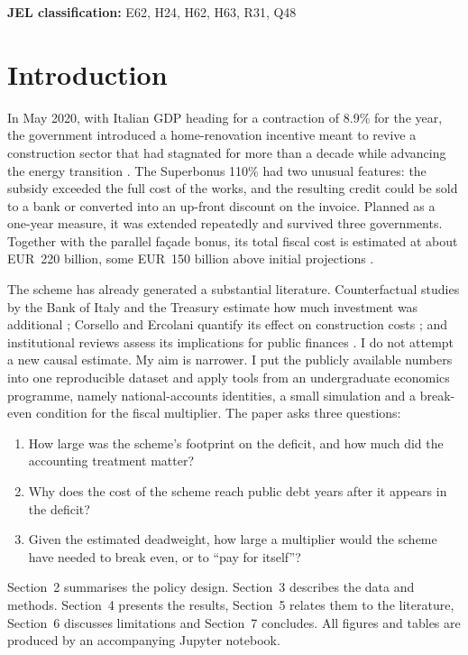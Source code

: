 \documentclass[11pt,a4paper]{article}
\begin{document}
\textbf{JEL classification:} E62, H24, H62, H63, R31, Q48

\section{Introduction}
In May 2020, with Italian GDP heading for a contraction of 8.9\% for the year, the government introduced a home-renovation incentive meant to revive a construction sector that had stagnated for more than a decade while advancing the energy transition \citep{capone2026}. The Superbonus 110\% had two unusual features: the subsidy exceeded the full cost of the works, and the resulting credit could be sold to a bank or converted into an up-front discount on the invoice. Planned as a one-year measure, it was extended repeatedly and survived three governments. Together with the parallel façade bonus, its total fiscal cost is estimated at about EUR~220 billion, some EUR~150 billion above initial projections \citep{capone2026}.

The scheme has already generated a substantial literature. Counterfactual studies by the Bank of Italy and the Treasury estimate how much investment was additional \citep{accetturo2026,mef_wp}; Corsello and Ercolani quantify its effect on construction costs \citep{corsello2024,corsello2025}; and institutional reviews assess its implications for public finances \citep{codogno2024,imf2024}. I do not attempt a new causal estimate. My aim is narrower. I put the publicly available numbers into one reproducible dataset and apply tools from an undergraduate economics programme, namely national-accounts identities, a small simulation and a break-even condition for the fiscal multiplier. The paper asks three questions:

\begin{enumerate}[leftmargin=1.5em,itemsep=2pt]
\item How large was the scheme's footprint on the deficit, and how much did the accounting treatment matter?
\item Why does the cost of the scheme reach public debt years after it appears in the deficit?
\item Given the estimated deadweight, how large a multiplier would the scheme have needed to break even, or to ``pay for itself''?
\end{enumerate}

Section~2 summarises the policy design. Section~3 describes the data and methods. Section~4 presents the results, Section~5 relates them to the literature, Section~6 discusses limitations and Section~7 concludes. All figures and tables are produced by an accompanying Jupyter notebook.
\end{document}
